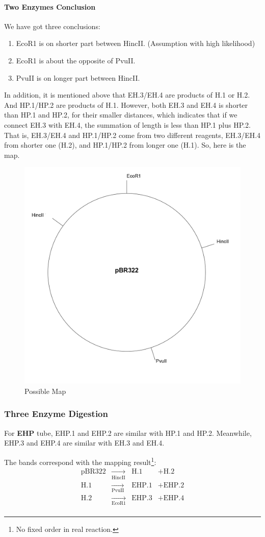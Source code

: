 \documentclass{article}
\begin{document}
                \paragraph{Two Enzymes Conclusion} We have got three conclusions:
                    \begin{enumerate}
                        \item EcoR1 is on shorter part between HincII. (Assumption with high likelihood)
                        \item EcoR1 is about the opposite of PvuII.
                        \item PvuII is on longer part between HincII.
                    \end{enumerate}
                In addition, it is mentioned above that EH.3/EH.4 are products of H.1 or H.2. And HP.1/HP.2 are products of H.1. However, both EH.3 and EH.4 is shorter than HP.1 and HP.2, for their smaller distances, which indicates that if we connect EH.3 with EH.4, the summation of length is less than HP.1 plus HP.2. That is, EH.3/EH.4 and HP.1/HP.2 come from two different reagents, EH.3/EH.4 from shorter one (H.2), and HP.1/HP.2 from longer one (H.1). So, here is the map.
                \begin{figure}[H]
                    \centering
                    \includegraphics[width = 0.4\linewidth]{../Data/Plasmid/III.png}
                    \caption{Possible Map}
                    \label{possible.map}
                \end{figure}

            \subsubsection{Three Enzyme Digestion}
                For \textbf{EHP} tube, EHP.1 and EHP.2 are similar with HP.1 and HP.2. Meanwhile, EHP.3 and EHP.4 are similar with EH.3 and EH.4.

                The bands correspond with the mapping result\footnote{No fixed order in real reaction.}:
                $$\begin{aligned}
                \text{pBR322}&\underset{\text{HincII}}{\rightarrow}&\text{H.1} &+ \text{H.2}\\
                \text{H.1}&\underset{\text{PvuII}}{\rightarrow}&\text{EHP.1} &+ \text{EHP.2}\\
                \text{H.2}&\underset{\text{EcoR1}}{\rightarrow}&\text{EHP.3} &+ \text{EHP.4}\\
                \end{aligned}$$
\end{document}
